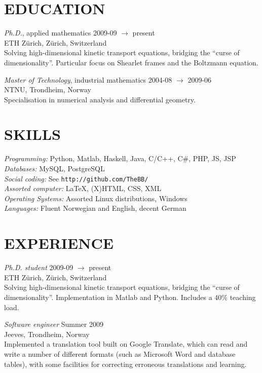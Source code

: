 \documentclass[line,margin]{res}
\newcommand{\zh}{Z\"{u}rich}
\begin{document}
\address{Forchstrasse 168, CH-8032 \zh}
\address{+41 78 634 68 37}


\begin{resume}

\section{EDUCATION} 
    {\em Ph.D.}, applied mathematics \hfill 2009-09 $\to$ present \\
    ETH \zh, \zh, Switzerland \\
    Solving high-dimensional kinetic transport equations, bridging the ``curse
    of dimensionality''. Particular focus on Shearlet frames and the Boltzmann
    equation.

    {\em Master of Technology}, industrial mathematics \hfill 2004-08 $\to$ 2009-06 \\
    NTNU, Trondheim, Norway \\
    Specialisation in numerical analysis and differential geometry.


\section{SKILLS}
    {\em Programming:} Python, Matlab, Haskell, Java, C/C++, C\#, PHP, JS, JSP\\
    {\em Databases:} MySQL, PostgreSQL \\
    {\em Social coding:} See {\tt http://github.com/TheBB/} \\
    {\em Assorted computer:} \LaTeX, (X)HTML, CSS, XML \\
    {\em Operating Systems:} Assorted Linux distributions, Windows \\
    {\em Languages:} Fluent Norwegian and English, decent German


\section{EXPERIENCE} 
    {\em Ph.D. student} \hfill 2009-09 $\to$ present \\
    ETH \zh, \zh, Switzerland \\
    Solving high-dimensional kinetic transport equations, bridging the ``curse
    of dimensionality''.  Implementation in Matlab and Python. Includes a 40\%
    teaching load.

    {\em Software engineer} \hfill Summer 2009 \\
    Jeeves, Trondheim, Norway \\
    Implemented a translation tool built on Google Translate, which can read and
    write a number of different formats (such as Microsoft Word and database
    tables), with some facilities for correcting erroneous translations and
    learning.


\end{resume}
\end{document}
